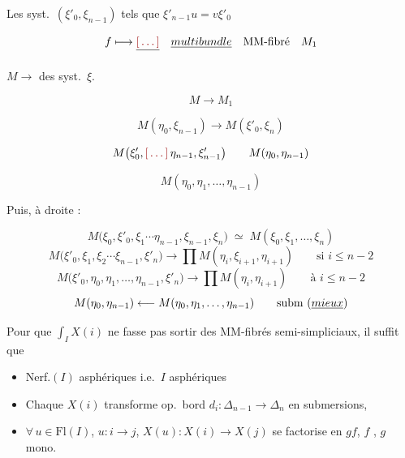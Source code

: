\documentclass[11pt,a4paper]{article}
\begin{document}
Les syst.\ $(\xi'_0, \xi_{n-1})$ tels que $\xi'_{n-1} u = v \xi'_0$

\[
f \longmapsto \struck{\ill{}} \quad \struck{multibundle} \quad \text{MM-fibré} \quad M_1
\]

$M \longrightarrow$  des syst.\ $\xi$.

\[
M \longrightarrow M_1
\]


\[
M(\eta_0, \xi_{n-1}) \longrightarrow M(\xi'_0, \xi_n)
\]

\[
M\bigl(\xi'_0, \ill{}\, \eta_{n-1}, \xi'_{n-1}\bigr) \qquad M(\eta_0, \eta_{n-1})
\]

\[
M(\eta_0, \eta_1, \dots, \eta_{n-1})
\]

Puis, à droite :

\[
M\bigl(\xi_0, \xi'_0, \xi_1 \cdots \eta_{n-1}, \xi_{n-1}, \xi_n\bigr)
\;\simeq\; M(\xi_0, \xi_1, \dots, \xi_n)
\]
\[
M\bigl(\xi'_0, \xi_1, \xi_2 \cdots \xi_{n-1}, \xi'_n\bigr)
\longrightarrow \prod M(\eta_i, \xi_{i+1}, \eta_{i+1})
\qquad \text{si } i \leqslant n-2
\]
\[
M\bigl(\xi'_0, \eta_0, \eta_1, \dots, \eta_{n-1}, \xi'_n\bigr)
\longrightarrow \prod M(\eta_i, \eta_{i+1})
\qquad \text{à } i \leqslant n-2
\]
\[
M(\eta_0, \eta_{n-1}) \longleftarrow M(\eta_0, \eta_1, \dots, \eta_{n-1})
\qquad \text{subm } (\uncertain{mieux})
\]


Pour que $\int_I X(i)$ ne fasse pas sortir des MM-fibrés semi-simpliciaux, il
suffit que

\begin{itemize}
  \item[a)] Nerf.$(I)$ asphériques i.e.\ $I$ asphériques
  \item[b)] Chaque $X(i)$ transforme op.\ bord $d_i : \Delta_{n-1} \to \Delta_n$
    en submersions,
  \item[c)] $\forall\, u \in \mathrm{Fl}(I)$, $u : i \to j$,
    $X(u) : X(i) \to X(j)$ se factorise en $g f$, \ill{} $f$
    , $g$ mono.
\end{itemize}
\end{document}
